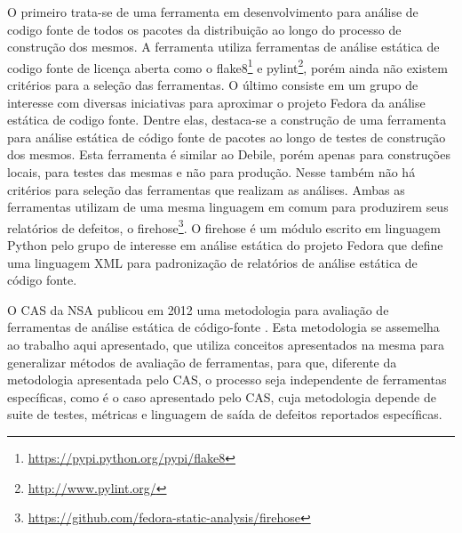   O primeiro trata-se de uma ferramenta em desenvolvimento para análise de codigo fonte de todos os pacotes da distribuição ao longo do processo de construção dos mesmos. A ferramenta utiliza ferramentas de análise estática de codigo fonte de licença aberta como o flake8\footnote{\url{https://pypi.python.org/pypi/flake8}} e pylint\footnote{\url{http://www.pylint.org/}}, porém ainda não existem critérios para a seleção das ferramentas. O último consiste em um grupo de interesse com diversas iniciativas para aproximar o projeto Fedora da análise estática de codigo fonte. Dentre elas, destaca-se a construção de uma ferramenta para análise estática de código fonte de pacotes ao longo de testes de construção dos mesmos. Esta ferramenta é similar ao Debile, porém  apenas para construções locais, para testes das mesmas e não para produção. Nesse também não há critérios para seleção das ferramentas que realizam as análises. Ambas as ferramentas utilizam de uma mesma linguagem em comum para produzirem seus relatórios de defeitos, o firehose\footnote{\url{https://github.com/fedora-static-analysis/firehose}}. O firehose é um módulo escrito em linguagem Python pelo grupo de interesse em análise estática do projeto Fedora que define uma linguagem XML para padronização de relatórios de análise estática de código fonte.

  O CAS da NSA publicou em 2012 uma metodologia para avaliação de ferramentas de análise estática de código-fonte \cite{nsa}. Esta metodologia se assemelha ao trabalho aqui apresentado, que utiliza conceitos apresentados na mesma para generalizar métodos de avaliação de ferramentas, para que, diferente da metodologia apresentada pelo CAS, o processo seja independente de ferramentas específicas, como é o caso apresentado pelo CAS, cuja metodologia depende de suite de testes, métricas e linguagem de saída de defeitos reportados específicas.

